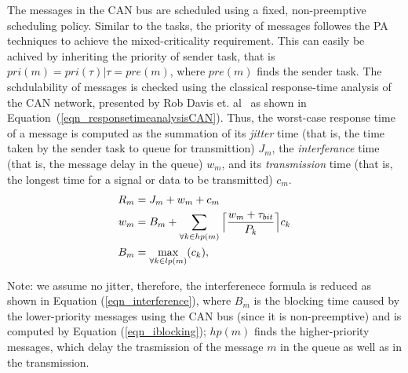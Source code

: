The messages in the CAN bus are scheduled using a fixed, non-preemptive scheduling policy. Similar to the tasks, the priority of messages followes the PA techniques to achieve the mixed-criticality requirement. This can easily be achived by inheriting the priority of sender task, that is $pri(m)=pri(\tau)|\tau = pre(m)$, where $pre(m)$ finds the sender task. The schdulability of messages is checked using the classical response-time analysis of the CAN network, presented by Rob Davis et. al~\cite{RobDavis-CAN-2007} as shown in Equation~(\ref{eqn_responsetimeanalysisCAN}). Thus, the worst-case response time of a message is computed as the summation of its \textit{jitter} time (that is, the time  taken by the sender task to queue for transmittion) $J_m$, the \textit{interferance} time (that is, the message delay in the queue) $w_m$, and its \textit{transmission} time  (that is, the longest time for a signal or data to be transmitted) $c_m$.
\begin{align}
\label{eqn_responsetimeanalysisCAN}
R_m&=J_m+w_m+c_m\\
\label{eqn_interference}
w_m&=B_m+
\sum_{\forall k\in hp(m)}
{
	\ceil[\Big]
	{
		\frac{w_m+\tau_{bit}}{P_k}
	}c_k
}\\
\label{eqn_iblocking}
B_m&=\max_{\forall k\in lp(m)}(c_k),
\end{align}

Note: we assume no jitter, therefore, the interferenece formula is reduced as shown in Equation (\ref{eqn_interference}), where $B_m$ is the blocking time caused by the lower-priority messages using the CAN bus (since it is non-preemptive) and is computed by Equation (\ref{eqn_iblocking}); $hp(m)$ finds the higher-priority messages, which delay the trasmission of the message $m$ in the queue as well as in the transmission.

